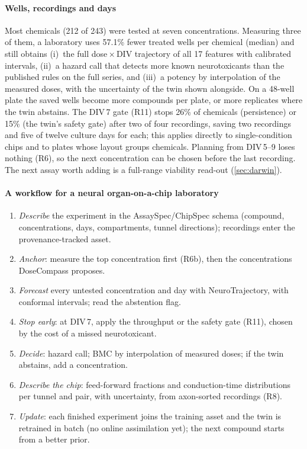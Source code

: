 \documentclass[11pt,a4paper]{article}
\newcommand{\NT}{NeuroTrajectory}
\newcommand{\DC}{DoseCompass}
\newcommand{\nChem}{243}
\newcommand{\nSevenLv}{212}
\newcommand{\wellsSaved}{57.1}
\begin{document}
\paragraph{Wells, recordings and days}
Most chemicals (\nSevenLv{} of \nChem) were tested at seven concentrations. Measuring three of them, a laboratory
uses \wellsSaved\% fewer treated wells per chemical (median) and still obtains (i)~the full dose\,\(\times\)\,DIV trajectory of all 17 features with calibrated
intervals, (ii)~a hazard call that detects more known neurotoxicants than the published rules on the full series, and
(iii)~a potency by interpolation of the measured doses, with the uncertainty of the twin shown alongside. On a
48-well plate the saved wells become more compounds per plate, or more replicates where the twin abstains. The
DIV\,7 gate (R11) stops 26\% of chemicals
(persistence) or 15\% (the twin's safety gate)
after two of four recordings, saving two recordings and five of twelve culture days for each; this applies directly to
single-condition chips and to plates whose layout groups chemicals. Planning from DIV\,5--9 loses nothing (R6), so
the next concentration can be chosen before the last recording. The next assay worth adding is a full-range viability
read-out (\cref{sec:darwin}).

\paragraph{A workflow for a neural organ-on-a-chip laboratory}
\begin{enumerate}[label=\arabic*.]
\item \emph{Describe} the experiment in the AssaySpec/ChipSpec schema (compound, concentrations, days, compartments,
tunnel directions); recordings enter the provenance-tracked asset.
\item \emph{Anchor}: measure the top concentration first (R6b), then the concentrations \DC{} proposes.
\item \emph{Forecast} every untested concentration and day with \NT, with conformal intervals; read the abstention flag.
\item \emph{Stop early}: at DIV\,7, apply the throughput or the safety gate (R11), chosen by the cost of a missed
neurotoxicant.
\item \emph{Decide}: hazard call; BMC by interpolation of measured doses; if the twin abstains, add a concentration.
\item \emph{Describe the chip}: feed-forward fractions and conduction-time distributions per tunnel and pair, with
uncertainty, from axon-sorted recordings (R8).
\item \emph{Update}: each finished experiment joins the training asset and the twin is retrained in batch (no
online assimilation yet); the next compound starts from a better prior.
\end{enumerate}
\end{document}
